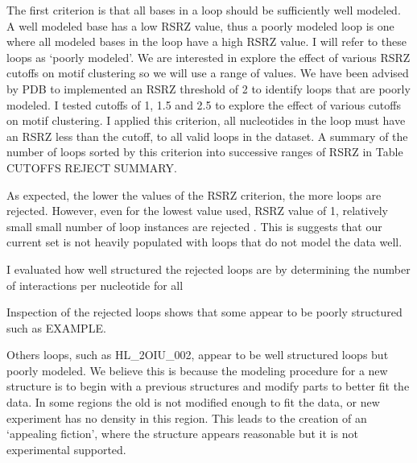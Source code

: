 The first criterion is that all bases in a loop should be sufficiently well
modeled. A well modeled base has a low RSRZ value, thus a poorly modeled loop is
one where all modeled bases in the loop have a high RSRZ value. I will refer to
these loops as ‘poorly modeled’. We are interested in explore the effect of
various RSRZ cutoffs on motif clustering so we will use a range of values. We
have been advised by PDB to implemented an RSRZ threshold of 2 to identify loops
that are poorly modeled. I tested cutoffs of 1, 1.5 and 2.5 to explore the
effect of various cutoffs on motif clustering. I applied this criterion, all
nucleotides in the loop must have an RSRZ less than the cutoff, to all valid
loops in the dataset. A summary of the number of loops sorted by this criterion
into successive ranges of RSRZ in Table CUTOFFS REJECT SUMMARY. 

\begin{table}
  \begin{tabular}
  \end{tabular}
  \caption{Number of loops Exceeding different RSRZ cutoff values: Counts of the
    number of loops of each type rejected by the criteria that requires all
    nucleotides in a base to pass the RSRZ cutoff. The percentages are the
    percent of loops rejected out of all loops. The data is for all valid X-ray
  loops from the NR release 2.85.}
\end{table}


As expected, the lower the values of the RSRZ criterion, the more loops are
rejected. However, even for the lowest value used, RSRZ value of 1, relatively
small small number of loop instances are rejected . This is suggests that our
current set is not heavily populated with loops that do not model the data well.

I evaluated how well structured the rejected loops are by determining the number
of interactions per nucleotide for all

Inspection of the rejected loops shows that some appear to be poorly structured
such as EXAMPLE. 
 
Others loops, such as HL\_2OIU\_002, appear to be well structured loops but poorly
modeled. We believe this is because the modeling procedure for a new structure
is to begin with a previous structures and modify parts to better fit the data.
In some regions the old is not modified enough to fit the data, or new
experiment has no density in this region. This leads to the creation of an
‘appealing fiction’, where the structure appears reasonable but it is not
experimental supported.

